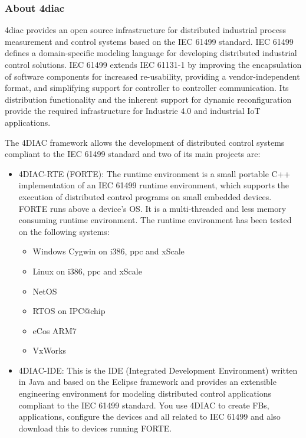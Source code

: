 
\let\svus\_
\newcommand\newuson{\def\_{\svus\allowbreak\hspace{0pt}}}
\newcommand\newusoff{\let\_\svus}
\newuson

\subsubsection{About 4diac}\label{sec:simulators:4diac:about4diac}

4diac provides an open source infrastructure for distributed industrial process measurement and control systems based on the IEC 61499 standard. IEC 61499 defines a domain-specific
modeling language for developing distributed industrial control solutions. IEC 61499 extends IEC 61131-1 by improving the encapsulation of software components for increased re-usability, 
providing a vendor-independent format, and simplifying support for controller to controller communication. Its distribution functionality and the inherent support for dynamic reconfiguration 
provide the required infrastructure for Industrie 4.0 and industrial IoT applications.

The 4DIAC framework allows the development of distributed control systems compliant to the IEC 61499 standard and two of its main projects are:

\begin{itemize}
  \item 4DIAC-RTE (FORTE): The runtime environment is a small portable C++ implementation of an IEC 61499 runtime environment, which supports the execution of distributed control programs 
  on small embedded devices. FORTE runs above a device's OS. It is a multi-threaded and less memory consuming runtime environment. The runtime environment has been tested on the following systems:
  \begin{itemize}
    \item Windows Cygwin on i386, ppc and xScale
    \item Linux on i386, ppc and xScale
    \item NetOS
    \item RTOS on IPC@chip
    \item eCos ARM7
    \item VxWorks
  \end{itemize}     
  \item 4DIAC-IDE: This is the IDE (Integrated Development Environment) written in Java and based on the Eclipse framework and provides an extensible engineering environment for modeling 
  distributed control applications compliant to the IEC 61499 standard. You use 4DIAC to create FBs, applications, configure the devices and all related to IEC 61499 and also download this 
  to devices running FORTE.
\end{itemize}

